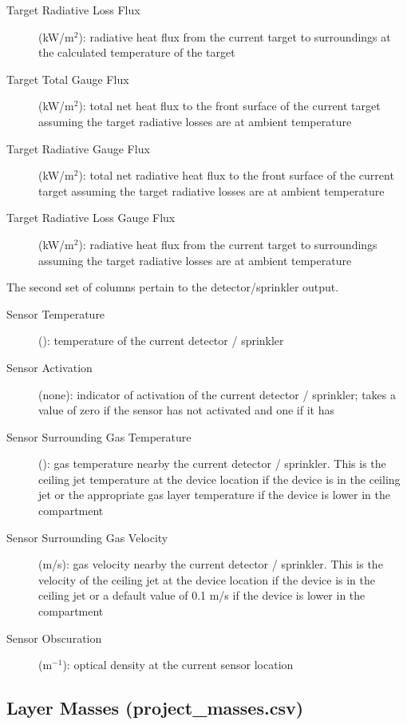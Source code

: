 \begin{description}
\item[Target Radiative Loss Flux] (kW/m$^2$):   radiative heat flux from the current target to surroundings at the calculated temperature of the target
\item[Target Total Gauge Flux] (kW/m$^2$): total net heat flux to the front surface of the current target assuming the target radiative losses are at ambient temperature
\item[Target Radiative Gauge Flux] (kW/m$^2$): total net radiative heat flux to the front surface of the current target assuming the target radiative losses are at ambient temperature
\item[Target Radiative Loss Gauge Flux] (kW/m$^2$):   radiative heat flux from the current target to surroundings assuming the target radiative losses are at ambient temperature
\end{description}
The second set of columns pertain to the detector/sprinkler output.

\begin{description}
\item[Sensor Temperature] (\degc): temperature of the current detector / sprinkler
\item[Sensor Activation] (none): indicator of activation of the current detector / sprinkler; takes a value of zero if the sensor has not activated and one if it has
\item[Sensor Surrounding Gas Temperature] (\degc): gas temperature nearby the current detector / sprinkler. This is the ceiling jet temperature at the device location if the device is in the ceiling jet or the appropriate gas layer temperature if the device is lower in the compartment
\item[Sensor Surrounding Gas Velocity] (m/s): gas velocity nearby the current detector / sprinkler. This is the velocity of the ceiling jet at the device location if the device is in the ceiling jet or a default value of 0.1 m/s if the device is lower in the compartment
\item[Sensor Obscuration] (m$^{-1}$):  optical density at the current sensor location
\end{description}

\subsection{Layer Masses (project\_masses.csv)}

